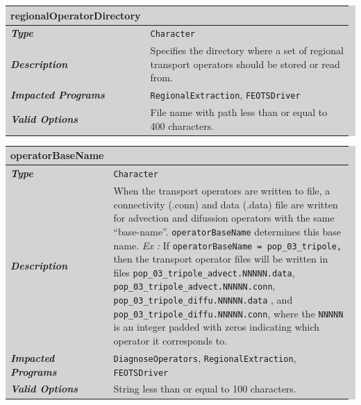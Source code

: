 \documentclass{softwaremanual}
\begin{document}
\noindent\begingroup\setlength{\fboxsep}{0pt}
\colorbox{lightgray}{
\begin{tabular}{p{0.25\linewidth} p{0.725\linewidth}}
\toprule
\textbf{regionalOperatorDirectory} & \\
\midrule
\textbf{\textit{Type}} & \texttt{Character} \\
\midrule
\textbf{\textit{Description}} & Specifies the directory where a set of regional transport operators should be stored or read from. \\
\midrule
\textbf{\textit{Impacted Programs}} & \texttt{RegionalExtraction}, \texttt{FEOTSDriver} \\
\midrule
\textbf{\textit{Valid Options}}  & File name with path less than or equal to 400 characters. \\
\bottomrule
\end{tabular}
}\endgroup

\noindent\begingroup\setlength{\fboxsep}{0pt}
\colorbox{lightgray}{
\begin{tabular}{p{0.25\linewidth} p{0.725\linewidth}}
\toprule
\textbf{operatorBaseName} & \\
\midrule
\textbf{\textit{Type}} & \texttt{Character} \\
\midrule
\textbf{\textit{Description}} & When the transport operators are written to file, a connectivity (.conn) and data (.data) file are written for advection and difussion operators with the same ``base-name''. \texttt{operatorBaseName} determines this base name. \textit{Ex :} If \texttt{operatorBaseName = pop\_03\_tripole,} then the transport operator files will be written in files \texttt{pop\_03\_tripole\_advect.NNNNN.data}, \texttt{pop\_03\_tripole\_advect.NNNNN.conn}, \texttt{pop\_03\_tripole\_diffu.NNNNN.data} , and \texttt{pop\_03\_tripole\_diffu.NNNNN.conn}, where the \texttt{NNNNN} is an integer padded with zeros indicating which operator it corresponds to.  \\
\midrule
\textbf{\textit{Impacted Programs}} & \texttt{DiagnoseOperators}, \texttt{RegionalExtraction}, \texttt{FEOTSDriver} \\
\midrule
\textbf{\textit{Valid Options}}  & String less than or equal to 100 characters. \\
\bottomrule
\end{tabular}
}\endgroup
\end{document}
